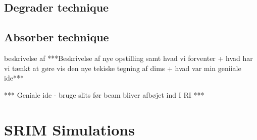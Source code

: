 \begin{table}[ht]
    \centering
    \caption{A comparison of the performance parameters for the three isobar suppression methods used at VERA in  detection. The overall ion detection efficiency refers to the detection efficiency from the anion beam in the ion source to the final  detection, excluding the ionization yields of the sputter source.}
    \label{tab:comparison}
\end{table}




\subsection{Degrader technique}


\subsection{Absorber technique}
beskrivelse af
***Beskrivelse af nye opstilling samt hvad vi forventer +  hvad har vi tænkt at gøre vis den nye tekiske tegning af dims + hvad var min geniiale ide***

***
Geniale ide - bruge slits før beam bliver afbøjet ind I RI
***

\section{SRIM Simulations}
\newpage